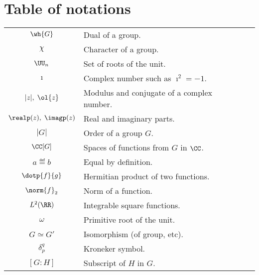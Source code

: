 \listofnotationsstyle{}
\chapter *{Table of notations}
\thispagestyle{empty}
\tabletail{\hline}
\tablelasttail{\hline}
\begin{center}
\begin{supertabular}{| c | p{9cm} | c |}
$ \wh{G} $ & Dual of a group. & \pageref{notation-0} \\[1mm]
$ \chi $ & Character of a group. & \pageref{notation-1} \\[1mm]
$ \UU_n $ & Set of  roots of the unit. & \pageref{notation-2} \\[1mm]
$ \imath $ & Complex number such as $ \imath^2 = -1 $. & \pageref{notation-3} \\[1mm]
$ | z |, \; \ol{z} $ & Modulus and conjugate of a complex number. & \pageref{notation-4} \\[1mm]
$ \realp (z), \; \imagp (z) $ & Real and imaginary parts. & \pageref{notation-5} \\[1mm]
$ |G| $ & Order of a group $ G $. & \pageref{notation-6} \\[1mm]
$ \CC [G] $ & Spaces of functions from $ G $ in $ \CC $. & \pageref{notation-7} \\[1mm]
$ a \eqdef b $ & Equal by definition. & \pageref{notation-8} \\[1mm]
$ \dotp{f}{g} $ & Hermitian product of two functions. & \pageref{notation-9} \\[1mm]
$ \norm{f}_2 $ & Norm of a function. & \pageref{notation-10} \\[1mm]
$ L^2 (\RR) $ & Integrable square functions. & \pageref{notation-11} \\[1mm]
$ \omega $ & Primitive root of the unit. & \pageref{notation-12} \\[1mm]
$ G \simeq G'$ & Isomorphism (of group, etc). & \pageref{notation-13} \\[1mm]
$ \delta_p^q $ & Kroneker symbol. & \pageref{notation-14} \\[1mm]
$ [G: H] $ & Subscript of $ H $ in $ G $. & \pageref{notation-15} \\[1mm]

\end{supertabular}
\end{center}
